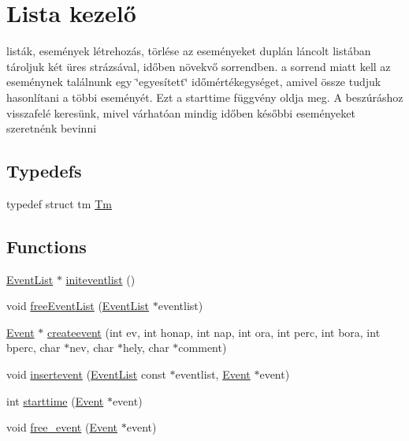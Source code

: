 \hypertarget{group__list}{}\section{Lista kezelő}
\label{group__list}


listák, események létrehozás, törlése az eseményeket duplán láncolt listában tároljuk két üres strázsával, időben növekvő sorrendben. a sorrend miatt kell az eseménynek találnunk egy \char`\"{}egyesített\char`\"{} időmértékegységet, amivel össze tudjuk hasonlítani a többi eseményét. Ezt a starttime függvény oldja meg. A beszúráshoz visszafelé keresünk, mivel várhatóan mindig időben későbbi eseményeket szeretnénk bevinni  


\subsection*{Typedefs}
\begin{DoxyCompactItemize}
\item 
typedef struct tm \hyperlink{group__list_gaffc453d30a4a6ce81ed778fd04d2d256}{Tm}
\end{DoxyCompactItemize}
\subsection*{Functions}
\begin{DoxyCompactItemize}
\item 
\hyperlink{struct_event_list}{Event\+List} $\ast$ \hyperlink{group__list_ga48f44148563512bd32274821f478bd1b}{initeventlist} ()
\item 
void \hyperlink{group__list_ga4293a94245f5abec38c480114aa58b23}{free\+Event\+List} (\hyperlink{struct_event_list}{Event\+List} $\ast$eventlist)
\item 
\hyperlink{struct_event}{Event} $\ast$ \hyperlink{group__list_ga24fd1b37eee54600b66c42e86b52244a}{createevent} (int ev, int honap, int nap, int ora, int perc, int bora, int bperc, char $\ast$nev, char $\ast$hely, char $\ast$comment)
\item 
void \hyperlink{group__list_ga068e74dedbc5bf00dd54042ab3fac981}{insertevent} (\hyperlink{struct_event_list}{Event\+List} const $\ast$eventlist, \hyperlink{struct_event}{Event} $\ast$event)
\item 
int \hyperlink{group__list_ga8f7708495c6e39bb6e712218711b331f}{starttime} (\hyperlink{struct_event}{Event} $\ast$event)
\item 
void \hyperlink{group__list_gafd63217de3b7f7269aa3ee9d14b6b578}{free\+\_\+event} (\hyperlink{struct_event}{Event} $\ast$event)
\end{DoxyCompactItemize}


